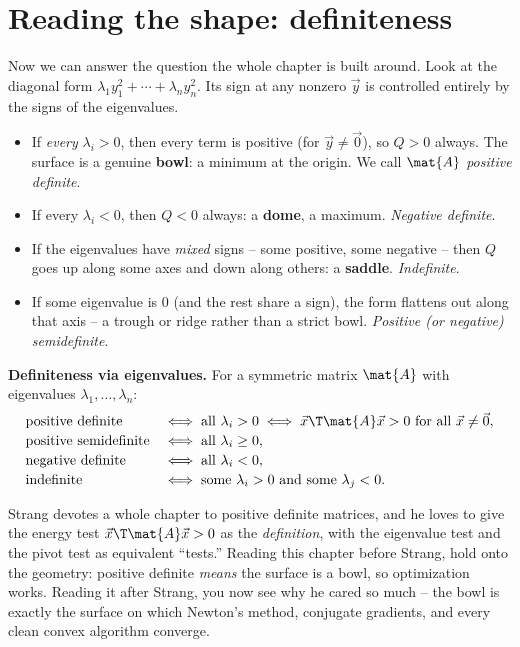\section{Reading the shape: definiteness}
\label{ch36:definiteness}

Now we can answer the question the whole chapter is built around. Look at the
diagonal form $\lambda_1 y_1^2 + \cdots + \lambda_n y_n^2$. Its sign at any nonzero
$\vec{y}$ is controlled entirely by the signs of the eigenvalues.

\begin{itemize}
\item If \emph{every} $\lambda_i>0$, then every term is positive (for $\vec{y}\ne
\vec{0}$), so $Q>0$ always. The surface is a genuine \textbf{bowl}: a minimum at the
origin. We call $\mat{A}$ \emph{positive definite}.
\item If every $\lambda_i<0$, then $Q<0$ always: a \textbf{dome}, a maximum.
\emph{Negative definite}.
\item If the eigenvalues have \emph{mixed} signs -- some positive, some negative --
then $Q$ goes up along some axes and down along others: a \textbf{saddle}.
\emph{Indefinite}.
\item If some eigenvalue is $0$ (and the rest share a sign), the form flattens out
along that axis -- a trough or ridge rather than a strict bowl. \emph{Positive (or
negative) semidefinite}.
\end{itemize}

\begin{formalbox}
\label{ch36:thm-definiteness}
\textbf{Definiteness via eigenvalues.} For a symmetric matrix $\mat{A}$ with eigenvalues $\lambda_1,\dots,\lambda_n$:
\[
\begin{array}{ll}
\text{positive definite} & \iff \text{all } \lambda_i > 0 \iff \vec{x}\T\mat{A}\vec{x} > 0 \text{ for all } \vec{x}\ne\vec{0},\\[2pt]
\text{positive semidefinite} & \iff \text{all } \lambda_i \ge 0,\\[2pt]
\text{negative definite} & \iff \text{all } \lambda_i < 0,\\[2pt]
\text{indefinite} & \iff \text{some } \lambda_i>0 \text{ and some } \lambda_j<0.
\end{array}
\]
\end{formalbox}

\begin{strangbox}
Strang devotes a whole chapter to positive definite matrices, and he loves to give
the energy test $\vec{x}\T\mat{A}\vec{x}>0$ as the \emph{definition}, with the
eigenvalue test and the pivot test as equivalent ``tests.'' Reading this chapter
before Strang, hold onto the geometry: positive definite \emph{means} the surface is
a bowl, so optimization works. Reading it after Strang, you now see why he cared so
much -- the bowl is exactly the surface on which Newton's method, conjugate
gradients, and every clean convex algorithm converge.
\end{strangbox}

